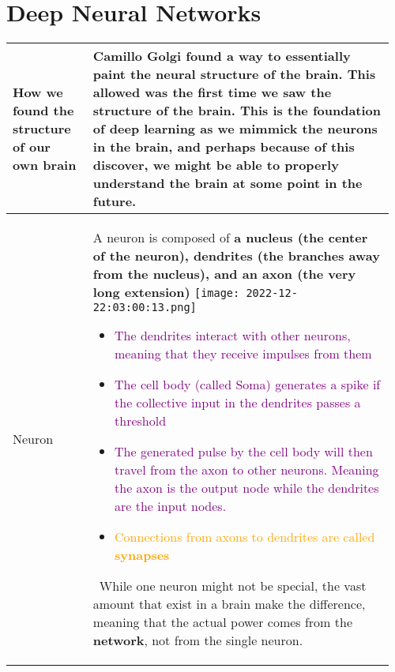 \documentclass[main.tex,fontsize=8pt,paper=a4,paper=portrait,DIV=calc,]{scrartcl}
\begin{document}
\begin{table}[ht!]
\section{Deep Neural Networks}
\begin{tabular}{|m{0.2\linewidth}|m{0.755\linewidth}|}
\hline
How we found the structure of our own brain & 
\textbf{Camillo Golgi} found a way to essentially paint the neural structure of the brain. This allowed was the first time we saw the structure of the brain. 
This is the foundation of deep learning as we mimmick the neurons in the brain, and perhaps because of this discover, we might be able to properly understand the brain at some point in the future.
\\
\hline
Neuron & 
A neuron is composed of \textbf{a nucleus (the center of the neuron), dendrites (the branches away from the nucleus), and an axon (the very long extension)}\newline
\texttt{[image: 2022-12-22:03:00:13.png]}\newline
\begin{itemize}
\item \textcolor{purple}{The dendrites interact with other neurons, meaning that they receive impulses from them}
\item \textcolor{purple}{The cell body (called Soma) generates a spike if the collective input in the dendrites passes a threshold}
\item \textcolor{purple}{The generated pulse by the cell body will then travel from the axon to other neurons. Meaning the axon is the output node while the dendrites are the input nodes.}
\item \textcolor{orange}{Connections from axons to dendrites are called \textbf{synapses}}
\end{itemize}
\, \newline
\textcolor{OliveGreen}{While one neuron might not be special, the vast amount that exist in a brain make the difference, meaning that the actual power comes from the \textbf{network}, not from the single neuron.}
\\
\hline
\end{tabular}
\end{table}
\pagebreak
\end{document}
